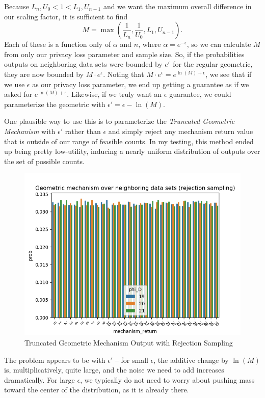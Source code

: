 \documentclass[11pt]{scrartcl} %
\begin{document}
Because $L_n, U_0 < 1 < L_1, U_{n-1}$ and we want the maximum overall difference in our scaling factor, it is sufficient to find
\[ M = \max \left( \frac{1}{L_n}, \frac{1}{U_0}, L_1, U_{n-1} \right). \]
Each of these is a function only of $\alpha$ and $n$, where $\alpha = e^{-\epsilon}$, so we can calculate $M$
from only our privacy loss parameter and sample size. So, if the probabilities outputs on neighboring data sets
were bounded by $e^{\epsilon}$ for the regular geometric, they are now bounded by $M \cdot e^{\epsilon}$.
Noting that $M \cdot e^{\epsilon} = e^{\ln(M) + \epsilon}$, we see that if we use $\epsilon$ as our
privacy loss parameter, we end up getting a guarantee as if we asked for $e^{\ln(M) + \epsilon}$.
Likewise, if we truly want an $\epsilon$ guarantee, we could parameterize the geometric with
$\epsilon' = \epsilon - \ln(M)$. \newline

One plausible way to use this is to parameterize the \emph{Truncated Geometric Mechanism}
with $\epsilon'$ rather than $\epsilon$ and simply reject any mechanism return value that is outside
of our range of feasible counts.
In my testing, this method ended up being pretty low-utility, inducing a nearly uniform distribution
of outputs over the set of possible counts.
\begin{figure}[H]
    \includegraphics[width = \textwidth]{rejection_sampling_geometric_mech_dist.png}
    \caption{Truncated Geometric Mechanism Output with Rejection Sampling}
\end{figure}

The problem appears to be with $\epsilon'$ --
for small $\epsilon$, the additive change by $\ln(M)$ is, multiplicatively, quite large,
and the noise we need to add increases dramatically. For large $\epsilon$, we typically do not
need to worry about pushing mass toward the center of the distribution, as it is already there. \newline
\end{document}
